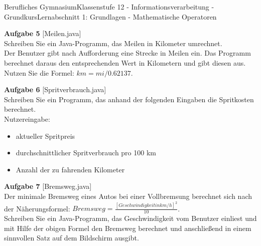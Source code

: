 \documentclass[oneside,openany,headings=optiontotoc,11pt,numbers=noenddot]{scrreprt}
\begin{document}
\begin{worksheet}{Berufliches Gymnasium}{Klassenstufe 12 - Informationsverarbeitung - Grundkurs}{Lernabschnitt 1: Grundlagen - Mathematische Operatoren}
\begin{framed}
			\par\noindent
			\textbf{Aufgabe 5} [Meilen.java]\\
			Schreiben Sie ein Java-Programm, das Meilen in Kilometer umrechnet.\\
			Der Benutzer gibt nach Aufforderung eine Strecke in Meilen ein. Das Programm berechnet daraus den entsprechenden Wert in Kilometern und gibt diesen aus.\\
			Nutzen Sie die Formel: \(km = mi/0.62137\).\\
			\par\noindent
			\textbf{Aufgabe 6} [Spritverbrauch.java]\\
			Schreiben Sie ein Programm, das anhand der folgenden Eingaben die Spritkosten berechnet.\\
			Nutzereingabe:
			\begin{itemize}[label=-]
				\itemsep0em
				\item aktueller Spritpreis
				\item durchschnittlicher Spritverbrauch pro 100 km
				\item Anzahl der zu fahrenden Kilometer
			\end{itemize}
			\textbf{Aufgabe 7} [Bremsweg.java]\\
			Der minimale Bremsweg eines Autos bei einer Vollbremsung berechnet sich nach der Näherungsformel: \(Bremsweg = \frac{[Geschwindigkeit in km/h]^2}{10}\).\\
			Schreiben Sie ein Java-Programm, das Geschwindigkeit vom Benutzer einliest und mit Hilfe der obigen Formel den Bremsweg berechnet und anschließend in einem sinnvollen Satz auf dem Bildschirm ausgibt.
		\end{framed}
	\end{worksheet}
\end{document}
